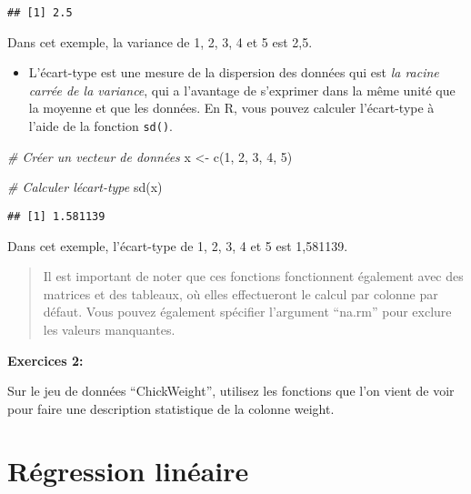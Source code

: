 \documentclass[
]{article}
\newenvironment{Shaded}{\begin{snugshade}}{\end{snugshade}}
\newcommand{\CommentTok}[1]{\textcolor[rgb]{0.56,0.35,0.01}{\textit{#1}}}
\newcommand{\DecValTok}[1]{\textcolor[rgb]{0.00,0.00,0.81}{#1}}
\newcommand{\FunctionTok}[1]{\textcolor[rgb]{0.00,0.00,0.00}{#1}}
\newcommand{\NormalTok}[1]{#1}
\newcommand{\OtherTok}[1]{\textcolor[rgb]{0.56,0.35,0.01}{#1}}
\providecommand{\tightlist}{%
  \setlength{\itemsep}{0pt}\setlength{\parskip}{0pt}}
\begin{document}
\begin{verbatim}
## [1] 2.5
\end{verbatim}

Dans cet exemple, la variance de 1, 2, 3, 4 et 5 est 2,5.

\begin{itemize}
\tightlist
\item
  L'écart-type est une mesure de la dispersion des données qui est \emph{la racine carrée de la variance}, qui a l'avantage de
  s'exprimer dans la même unité que la moyenne et que les données. En R, vous pouvez calculer l'écart-type à l'aide de la fonction \texttt{sd()}.
\end{itemize}

\begin{Shaded}
\begin{Highlighting}[]
\CommentTok{\# Créer un vecteur de données}
\NormalTok{x }\OtherTok{\textless{}{-}} \FunctionTok{c}\NormalTok{(}\DecValTok{1}\NormalTok{, }\DecValTok{2}\NormalTok{, }\DecValTok{3}\NormalTok{, }\DecValTok{4}\NormalTok{, }\DecValTok{5}\NormalTok{)}

\CommentTok{\# Calculer l\textquotesingle{}écart{-}type}
\FunctionTok{sd}\NormalTok{(x)}
\end{Highlighting}
\end{Shaded}

\begin{verbatim}
## [1] 1.581139
\end{verbatim}

Dans cet exemple, l'écart-type de 1, 2, 3, 4 et 5 est 1,581139.

\begin{quote}
Il est important de noter que ces fonctions fonctionnent également avec des matrices et des tableaux, où elles effectueront le calcul par colonne par défaut. Vous pouvez également spécifier l'argument ``na.rm'' pour exclure les valeurs manquantes.
\end{quote}

\textbf{Exercices 2:}

Sur le jeu de données ``ChickWeight'', utilisez les fonctions que l'on
vient de voir pour faire une description statistique de la colonne weight.

\hypertarget{ruxe9gression-linuxe9aire}{%
\section{Régression linéaire}\label{ruxe9gression-linuxe9aire}}
\end{document}
